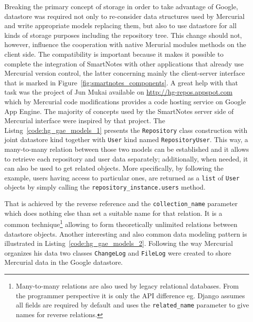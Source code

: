 Breaking the primary concept of storage in order to take advantage of Google, datastore was required not only to re-consider data structures used by Mercurial and write appropriate models replacing them, but also to use datastore for all kinds of storage purposes including the repository tree. This change should not, however, influence the cooperation with native Merurial modules methods on the client side. The compatibility is important because it makes it possible to complete the integration of SmartNotes with other applications that already use Mercurial version control, the latter concerning mainly the client-server interface that is marked in Figure~\ref{fig:smartnotes_components}. A great help with that task was the project of Jun Mukai available on \url{http://hg-repos.appspot.com} which by Mercurial code modifications provides a code hosting service on Google App Engine. The majority of concepts used by the SmartNotes server side of Mercurial interface were inspired by that project. The Listng~\ref{code:hg_gae_models_1} presents the \texttt{Repository} class construction with joint datastore kind together with \texttt{User} kind named \texttt{RepositoryUser}. This way, a many-to-many relation between those two models can be established and it allows to retrieve each repository and user data separately; additionally, when needed, it can also be used to get related objects. More specifically, by following the example, users having access to particular ones, are returned as a \texttt{list} of \texttt{User} objects by simply calling the \texttt{repository\_instance.users} method.  

That is achieved by the reverse reference and the \texttt{collection\_name} parameter which does nothing else than set a suitable name for that relation. It is a common technique\footnote{Many-to-many relations are also used by legacy relational databases. From the programmer perspective it is only the API difference eg. Django assumes all fields are required by default and uses the \texttt{related\_name} parameter to give names for reverse relations.} allowing to form theoretically unlimited relations between datastore objects. Another interesting and also common data modeling pattern is illustrated in Listing~\ref{code:hg_gae_models_2}. Following the way Mercurial organizes his data two classes \texttt{ChangeLog} and \texttt{FileLog} were created to shore Mercurial data in the Google datastore.
